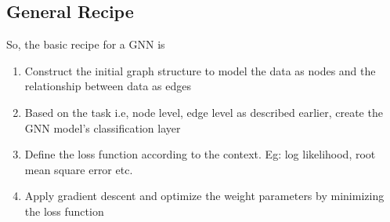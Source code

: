 \subsection{General Recipe}
So, the basic recipe for a GNN is
\begin{enumerate}
  \item Construct the initial graph structure to model the data as nodes and the relationship between data as edges
  \item Based on the task i.e, node level, edge level as described earlier, create the GNN model's classification layer
  \item Define the loss function according to the context. Eg: log likelihood, root mean square error etc.
  \item Apply gradient descent and optimize the weight parameters by minimizing the loss function
\end{enumerate}